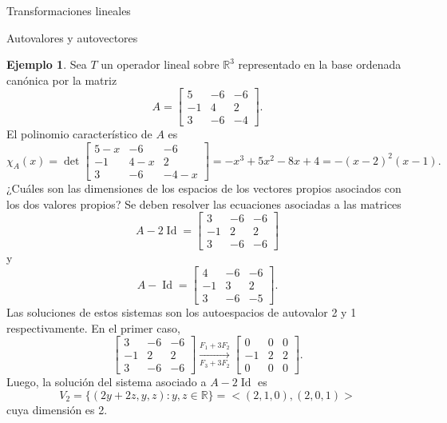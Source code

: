\documentclass[a4paper,12pt,twoside,spanish,reqno]{amsbook}
\theoremstyle{definition}
\newtheorem{ejemplo}{Ejemplo}[section]
\theoremstyle{remark}
\newcommand{\Id}{\operatorname{Id}}
\newcommand{\R}{\mathbb R}
\begin{document}
\begin{chapter}{Transformaciones lineales}
\begin{section}{Autovalores y autovectores}
        \begin{ejemplo}
            Sea $T$ un operador lineal sobre $\R^3$  representado en la base ordenada canónica por la matriz
            \begin{equation*}
                A = 
                \begin{bmatrix}
                5 &-6 &-6\\ -1& 4& 2\\3 &-6& -4
                \end{bmatrix}.
            \end{equation*}
            El  polinomio característico de $A$ es
            \begin{equation*}
                \chi_A(x) = \det \begin{bmatrix}
                    5-x &-6 &-6\\ -1& 4-x& 2\\3 &-6& -4-x
                \end{bmatrix} 
                = -x^3 + 5 x^2 - 8 x + 4 = -(x-2)^2(x-1).
            \end{equation*}
            ¿Cuáles son las dimensiones de los espacios de los vectores propios asociados
            con los dos valores propios? Se deben resolver las ecuaciones asociadas a las matrices
            \begin{equation*}
            A - 2 \Id = 
            \begin{bmatrix}
            3 &-6 &-6\\ -1& 2& 2\\3 &-6& -6
            \end{bmatrix} 
            \end{equation*}
            y 
            \begin{equation*}
            A -\Id= 
            \begin{bmatrix}
            4 &-6 &-6\\ -1& 3& 2\\3 &-6& -5
            \end{bmatrix}.
            \end{equation*}
            Las soluciones de estos sistemas son los autoespacios de autovalor 2 y 1 respectivamente. En  el primer caso, 
            \begin{equation*}
            \begin{bmatrix} 3 &-6 &-6\\ -1& 2& 2\\3 &-6& -6 \end{bmatrix}
            \underset{F_3+3F_2}{\stackrel{F_1+3 F_2}{\longrightarrow}} 
            \begin{bmatrix} 0 &0 &0\\ -1& 2& 2\\0 &0& 0 \end{bmatrix}.
            \end{equation*}
            Luego,  la solución del sistema asociado a $A-2\Id$ es 
            $$
            V_2 = \{(2y+2z,y,z): y,z \in \R\} = <(2,1,0),(2,0,1)>
            $$
            cuya dimensión es 2. 
            

\end{ejemplo}
\end{section}
\end{chapter}
\end{document}
